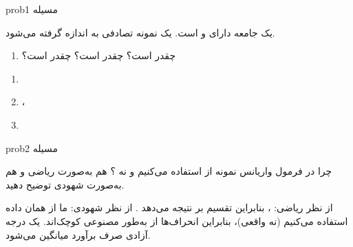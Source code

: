 \begin{PSbox}[unbreakable]{prob}{مسیله 1}

یک جامعه دارای  و  است. یک نمونه تصادفی به اندازه  گرفته می‌شود.

\begin{enumerate}
\def\labelenumi{(\alph{enumi})}
\tightlist
\item
   چقدر است؟  چقدر است؟  چقدر است؟
\end{enumerate}

\PSsolution{} 

\begin{enumerate}
\def\labelenumi{(\alph{enumi})}
\tightlist
\item
\item
  ، 
\item
\end{enumerate}

\end{PSbox}

\begin{PSbox}[unbreakable]{prob}{مسیله 2}

چرا در فرمول واریانس نمونه از  استفاده می‌کنیم و نه ؟ هم به‌صورت ریاضی و هم به‌صورت شهودی توضیح دهید.

\PSsolution{} از نظر ریاضی: ، بنابراین تقسیم بر  نتیجه می‌دهد . از نظر شهودی: ما از  همان داده استفاده می‌کنیم (نه \lr{\ensuremath{\mu}} واقعی)، بنابراین انحراف‌ها از  به‌طور مصنوعی کوچک‌اند. یک درجه آزادی صرف برآورد میانگین می‌شود.

\end{PSbox}

